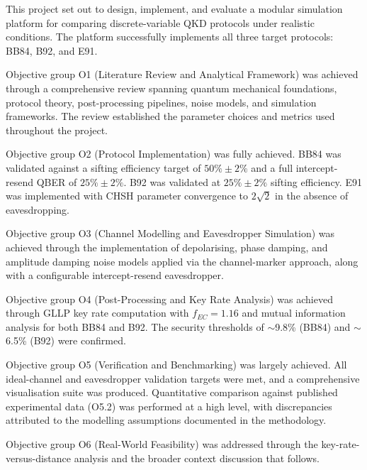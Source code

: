 \documentclass[10pt, a4paper]{report}
\begin{document}
This project set out to design, implement, and evaluate a modular simulation platform for comparing discrete-variable QKD protocols under realistic conditions. The platform successfully implements all three target protocols: BB84, B92, and E91.

Objective group O1 (Literature Review and Analytical Framework) was achieved through a comprehensive review spanning quantum mechanical foundations, protocol theory, post-processing pipelines, noise models, and simulation frameworks. The review established the parameter choices and metrics used throughout the project.

Objective group O2 (Protocol Implementation) was fully achieved. BB84 was validated against a sifting efficiency target of $50\% \pm 2\%$ and a full intercept-resend QBER of $25\% \pm 2\%$. B92 was validated at $25\% \pm 2\%$ sifting efficiency. E91 was implemented with CHSH parameter convergence to $2\sqrt{2}$ in the absence of eavesdropping.

Objective group O3 (Channel Modelling and Eavesdropper Simulation) was achieved through the implementation of depolarising, phase damping, and amplitude damping noise models applied via the channel-marker approach, along with a configurable intercept-resend eavesdropper.

Objective group O4 (Post-Processing and Key Rate Analysis) was achieved through GLLP key rate computation with $f_{EC} = 1.16$ and mutual information analysis for both BB84 and B92. The security thresholds of $\sim$9.8\% (BB84) and $\sim$6.5\% (B92) were confirmed.

Objective group O5 (Verification and Benchmarking) was largely achieved. All ideal-channel and eavesdropper validation targets were met, and a comprehensive visualisation suite was produced. Quantitative comparison against published experimental data (O5.2) was performed at a high level, with discrepancies attributed to the modelling assumptions documented in the methodology.

Objective group O6 (Real-World Feasibility) was addressed through the key-rate-versus-distance analysis and the broader context discussion that follows.



\end{document}
